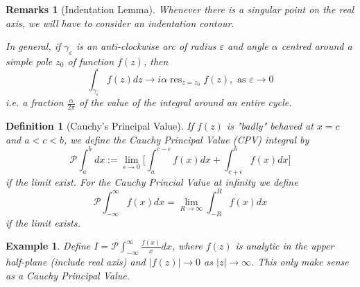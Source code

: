 \documentclass[a4paper]{article}
\DeclareMathOperator{\res}{res}
\newtheorem{remarks}{Remarks}[section]
\newtheorem{eg}{Example}[section]
\theoremstyle{new}
\newtheorem{defi}{Definition}[section]
\begin{document}
\begin{remarks}[Indentation Lemma]
Whenever there is a singular point on the real axis, we will have to consider an indentation contour.
 \begin{center}
  \end{center}
In general, if $\gamma_\varepsilon$ is an anti-clockwise arc of radius $\varepsilon$ and angle $\alpha$ centred around a simple pole $z_0$ of function $f(z)$, then 
$$\int_{\gamma_\varepsilon}f(z)dz\rightarrow i\alpha\res_{z=z_0}f(z),\text{ as }\varepsilon\rightarrow0$$
i.e. a fraction $\frac{\alpha}{2\pi}$ of the value of the integral around an entire cycle.
\end{remarks}
\begin{defi}[Cauchy's Principal Value]
If $f(z)$ is "badly" behaved at $x=c$ and $a<c<b$, we define the Cauchy Principal Value (CPV) integral by 
$$\mathcal{P}\int_{a}^{b}dx:=\lim_{\epsilon\rightarrow0}\bigg[\int_{a}^{c-\epsilon}f(x)dx+\int_{c+\epsilon}^{b}f(x)dx\bigg]$$
if the limit exist. For the Cauchy Princial Value at infinity we define
$$\mathcal{P}\int_{-\infty}^{\infty}f(x)dx=\lim _{R\rightarrow\infty}\int_{-R}^{R}f(x)dx$$
if the limit exists.
\end{defi}
\begin{eg}
Define $I=\mathcal{P}\int_{-\infty}^{\infty	}\frac{f(x)}{x}dx$, where $f(z)$ is  analytic in the upper half-plane (include real axis) and $|f(z)|\rightarrow0$ as $|z|\rightarrow \infty$. This only make sense as a Cauchy Principal Value.
\end{eg}
\newpage
\end{document}
